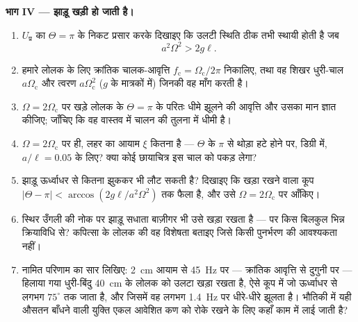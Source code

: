 \begin{problem}
\medskip\noindent\textbf{भाग IV --- झाड़ू खड़ी हो जाती है।}
\begin{enumerate}[resume]
  \item $U_{\text{प्र}}$ का $\Theta = \pi$ के निकट प्रसार करके दिखाइए
        कि उलटी स्थिति ठीक तभी स्थायी होती है जब
        \[
        a^2\Omega^2 > 2g\ell .
        \]
  \item हमारे लोलक के लिए क्रांतिक चालक-आवृत्ति $f_{\text{c}} =
        \Omega_{\text{c}}/2\pi$ निकालिए, तथा वह शिखर धुरी-चाल
        $a\Omega_{\text{c}}$ और त्वरण $a\Omega_{\text{c}}^2$ ($g$ के
        मात्रकों में) जिनकी वह माँग करती है।
  \item $\Omega = 2\Omega_{\text{c}}$ पर खड़े लोलक के $\Theta = \pi$ के
        परितः धीमे झूलने की आवृत्ति और उसका मान ज्ञात कीजिए; जाँचिए कि
        वह वास्तव में चालन की तुलना में धीमी है।
  \item $\Omega = 2\Omega_{\text{c}}$ पर ही, लहर का आयाम $\xi$ कितना है
        --- $\Theta$ के $\pi$ से थोड़ा हटे होने पर, डिग्री में,
        $a/\ell = 0.05$ के लिए? क्या कोई छायाचित्र इस चाल को पकड़ लेगा?
  \item झाड़ू ऊर्ध्वाधर से कितना झुककर भी लौट सकती है? दिखाइए कि खड़ा
        रखने वाला कूप $|\Theta - \pi| <
        \arccos(2g\ell/a^2\Omega^2)$ तक फैला है, और उसे $\Omega =
        2\Omega_{\text{c}}$ पर आँकिए।
  \item स्थिर उँगली की नोक पर झाड़ू सधाता बाज़ीगर भी उसे खड़ा रखता है
        --- पर किस बिलकुल भिन्न क्रियाविधि से? कपित्सा के लोलक की वह
        विशेषता बताइए जिसे किसी पुनर्भरण की आवश्यकता नहीं।
  \item नामित परिणाम का सार लिखिए: \qty{2}{cm} आयाम से \qty{45}{Hz} पर
        --- क्रांतिक आवृत्ति से दुगुनी पर --- हिलाया गया धुरी-बिंदु
        \qty{40}{cm} के लोलक को उलटा खड़ा रखता है, ऐसे कूप में जो
        ऊर्ध्वाधर से लगभग $75^\circ$ तक जाता है, और जिसमें वह लगभग
        \qty{1.4}{Hz} पर धीरे-धीरे झूलता है। भौतिकी में यही औसतन बाँधने
        वाली युक्ति एकल आवेशित कण को रोके रखने के लिए कहाँ काम में लाई
        जाती है?
\end{enumerate}
\end{problem}
